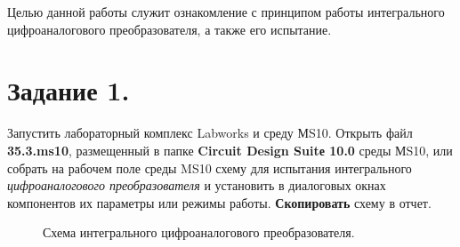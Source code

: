 \documentclass[spec, och, otchet, hidelinks]{SCWorks}
\begin{document}


\tableofcontents

\intro

Целью данной работы служит ознакомление с принципом работы интегрального цифроаналогового преобразователя, а также его испытание.

\newpage

\section*{Задание 1.}

Запустить лабораторный комплекс Labworks и среду МS10. Открыть файл \textbf{35.3.ms10}, размещенный в папке \textbf{Circuit Design Suitе 10.0} среды 
МS10, или собрать на рабочем поле среды MS10 схему для испытания интегрального \textit{цифроаналогового преобразователя} и установить в диалоговых 
окнах компонентов их параметры или режимы работы. \textbf{Скопировать} схему в отчет.

\begin{figure}[h]
	\caption{Схема интегрального цифроаналогового преобразователя.}
\end{figure}
\end{document}

